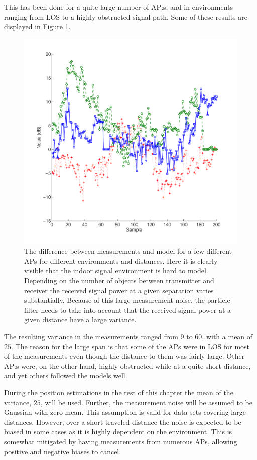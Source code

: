 \documentclass{LTHthesis}
\begin{document}
This has been done for a quite large number of AP:s, and in environments ranging from LOS to a highly obstructed signal path. Some of these results are displayed in Figure \ref{noise_behaviour}. 
%
\begin{figure}[!hbt]

\includegraphics[width=1\textwidth ]{images/pure_rssi/noise_behaviour}
\caption{The difference between measurements and model for a few different APs for different environments and distances. Here it is clearly visible that the indoor signal environment is hard to model. Depending on the number of objects between transmitter and receiver the received signal power at a given separation varies substantially. Because of this large measurement noise, the particle filter needs to take into account that the received signal power at a given distance have a large variance. }\label{noise_behaviour}
\end{figure}

The resulting variance in the measurements ranged from $9$ to $60$, with a mean of $25$. The reason for the large span is that some of the APs were in LOS for most of the measurements even though the distance to them was fairly large. Other AP:s were, on the other hand, highly obstructed while at a quite short distance, and yet others followed the models well. 

During the position estimations in the rest of this chapter the mean of the variance, $25$, will be used. Further, the measurement noise will be assumed to be Gaussian with zero mean. This assumption is valid for data sets covering large distances. However, over a short traveled distance the noise is expected to be biased in some cases as it is highly dependent on the environment. This is somewhat mitigated by having measurements from numerous APs, allowing positive and negative biases to cancel.
\end{document}
